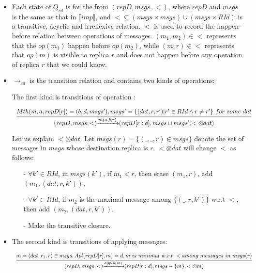 \begin {itemize}
\setlength{\itemsep}{0.5pt}
\item[-] Each state of $Q_{cd}$ is for the from $(repD,msgs,<)$, where $repD$ and $msgs$ is the same as that in $\llbracket imp \rrbracket$, and $< \subseteq (msgs \times msgs) \cup (msgs \times RId)$ is a transitive, acyclic and irreflexive relation. $<$ is used to record the happen-before relation between operations of messages. $(m_1,m_2) \in <$ represents that the $op(m_1)$ happen before $op(m_2)$, while $(m,r) \in <$ represents that $op(m)$ is visible to replica $r$ and does not happen before any operation of replica $r$ that we could know. 

\item[-] $\rightarrow_{cd}$ is the transition relation and contains two kinds of operations: 

    The first kind is transitions of operation : 
    
    $\begin{array}{l c} \bigfrac{ Mth(m,a,repD[r]) = (b,d,msgs'), msgs' = \{ (dat,r,r') \vert r' \in RId \wedge r \neq r' \} \ for \ some \ dat} {(repD,msgs,<) {\xrightarrow{m(a,b,r)}} (repD[r:d],msgs \cup msgs',< \otimes dat)} \end{array}$ 
    
    Let us explain $< \otimes dat$. Let $msgs(r) = \{ (\_,\_,r) \in msgs \}$ denote the set of messages in $msgs$ whose destination replica is $r$. $< \otimes dat$ will change $<$ as follows: 
    
    \begin{itemize}
    \setlength{\itemsep}{0.5pt}
    \item[-] $\forall k' \in RId$, in $msgs(k')$, if $m_1 < r$, then erase $(m_1,r)$, add $(m_1,(dat,r,k'))$, 
    
    \item[-] $\forall k' \in RId$, if $m_2$ is the maximal message among $\{ (\_,r,k') \}$ w.r.t $<$, then add $(m_2,(dat,r,k'))$. 
    
    \item[-] Make the transitive closure. 
    \end{itemize}
    
\item[-] The second kind is transitions of applying messages: 

    $\begin{array}{l c} \bigfrac{ m = (dat,r_1,r) \in msgs,Apl(repD[r],m) = d, m \ is \ minimal \ w.r.t \ < among \ messages \ in \ msgs(r) } {(repD,msgs,<) {\xrightarrow{apply(m)}} (repD[r:d],msgs - \{ m \}, < \otimes m )} \end{array}$


\end{itemize}
